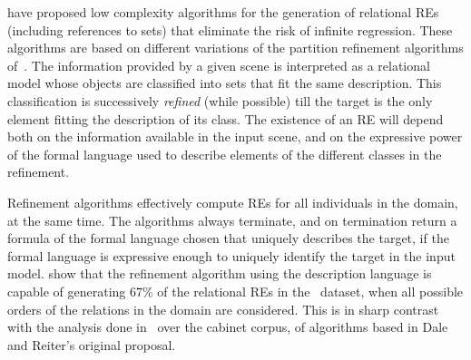  have proposed low complexity algorithms for the generation 
of relational REs (including references to sets) that eliminate the risk of infinite regression. 
These algorithms are based on different variations of the partition refinement algorithms of~.
The information provided by a given scene is interpreted as a relational model whose 
objects are classified into sets that fit the same description.  
This classification is successively \emph{refined} (while possible) till the target 
is the only element fitting the description of its class.  The existence of an RE will 
depend both on the information available in the input scene, and on the expressive power of the formal 
language used to describe elements of the different classes in the refinement. 


Refinement algorithms %
effectively compute REs for all individuals in the domain, at the same time. The algorithms always terminate, and on termination return a formula of 
the formal language chosen that uniquely describes the target, if the 
formal language is expressive enough to uniquely identify the target in the input model. 
show that the refinement algorithm using the description language \el  is capable of generating 67\% of 
the relational REs in the~\cite{viethen06:_algor_for_gener_refer_expres} dataset, when all possible orders of the relations in the domain are considered. This is in sharp contrast with the analysis 
done in~\cite{viethen06:_algor_for_gener_refer_expres} over the cabinet corpus, of algorithms based in Dale and Reiter's original proposal.    

